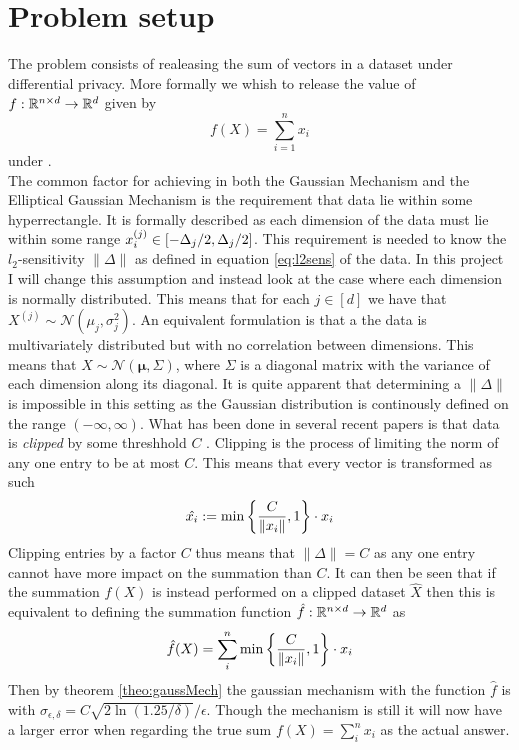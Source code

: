 \documentclass[a4paper,12pt]{article}
\begin{document}
\section{Problem setup}
The problem consists of realeasing the sum of vectors 
in a dataset under differential privacy.
More formally we whish to release the value of 
$f:\mathbb{R}^{n \times d} \rightarrow  \mathbb{R}^d$ given by
\[ f(X) = \sum_{i = 1}^n x_i  \] 
under \edp. \\
The common factor for achieving \edp in both the Gaussian Mechanism
and the Elliptical Gaussian Mechanism is the requirement that 
data lie within some hyperrectangle. It is formally described as 
each dimension of the data must lie within some range 
$ x^{(j)}_i \in \left [-\Delta_j/2, \Delta_j/2 \right] $. 
This requirement is needed to know the $l_2$-sensitivity $\| \Delta \|$ 
as defined in equation \ref{eq:l2sens} of the data.
In this project I will change this assumption and instead 
look at the case where each dimension is normally distributed.
This means that for each 
$ j \in [d] $ we have that 
$X^{(j)} \sim \mathcal{N}(\mu_j, \sigma_j^2)$.
An equivalent formulation is that a the data is 
multivariately distributed but with no correlation between dimensions.
This means that $X \sim \mathcal{N}(\bm{\mu}, \Sigma ) $, 
where $\Sigma$ is a diagonal matrix with the variance of each 
dimension along its diagonal.
It is quite apparent that determining a $ \| \Delta \|$ is impossible 
in this setting as the Gaussian distribution is continously defined 
on the range $ (-\infty, \infty)$. What has been done in several 
recent papers is that data is \textit{clipped} by some threshhold 
$C$ \cite{Huang2021,coinpress}. 
Clipping is the process of limiting the norm of any one entry 
to be at most $C$. This means that every vector is transformed as such
\[
    \hat{x_i} := \min \left \{\frac{C}{\| x_i \|}, 1\right\} \cdot x_i
\]
Clipping entries by a factor $C$ thus means that $\| \Delta \| = C $ 
as any one entry cannot have more impact on the summation than $C$.
It can then be seen that if the summation $f(X)$ is instead 
performed on a clipped dataset $\hat{X}$ then this is equivalent to
defining the summation function $\hat{f}: \mathbb{R}^{n \times d} \rightarrow \mathbb{R}^d$ as
\[
    \hat{f}(X) = \sum_i^n \min \left \{ \frac{C}{\| x_i \|}, 1\right\} \cdot x_i
    \]
Then by theorem \ref{theo:gaussMech} the 
gaussian mechanism with the function $\hat{f}$ is \edp with
$\sigma_{\epsilon, \delta} = C \sqrt{2 \ln (1.25/\delta)}/\epsilon$.
Though the mechanism is still \edp it will now have 
a larger error when regarding the true sum
$f(X) = \sum_i^n x_i$ as the actual answer.
\end{document}
